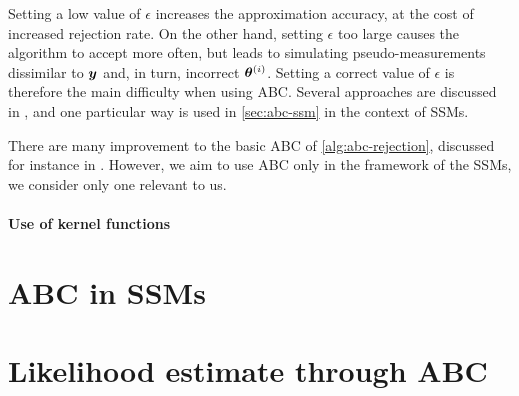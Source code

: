 Setting a low value of $\epsilon$ increases the approximation accuracy, at the cost of increased rejection rate. On the other hand, setting $\epsilon$ too large causes the algorithm to accept more often, but leads to simulating pseudo-measurements dissimilar to $\bm{y}$ and, in turn, incorrect $\bm{\theta}^{(i)}$. Setting a correct value of $\epsilon$ is therefore the main difficulty when using ABC. Several approaches are discussed in \cite{jasra-filtering, jasra-time-series}, and one particular way \citep{dedecius} is used in \autoref{sec:abc-ssm} in the context of SSMs.

There are many improvement to the basic ABC of \autoref{alg:abc-rejection}, discussed for instance in \cite{abc-recent}. However, we aim to use ABC only in the framework of the SSMs, we consider only one relevant to us.

\paragraph{Use of kernel functions}

\section{ABC in SSMs} \label{sec:abc-ssm}


\section{Likelihood estimate through ABC} \label{sec:abcmh}